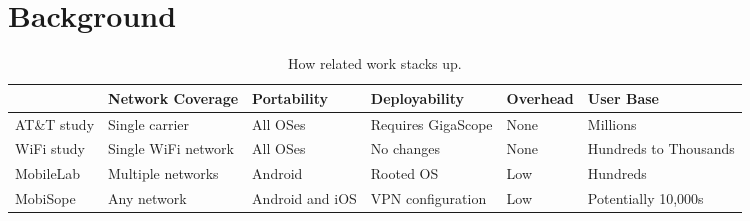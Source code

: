 \section{Background}
\label{sec:motivation}

\begin{table*}[t]
\begin{center}
\begin{tabular}{|l|l|l|l|l|l|}
\hline
 & \textbf{Network Coverage} &  \textbf{Portability} &  \textbf{Deployability} &  \textbf{Overhead} &  \textbf{User Base} \\ \hline
AT\&T study & Single carrier & All OSes & Requires GigaScope & None & Millions \\ \hline
WiFi study & Single WiFi network & All OSes & No changes & None & Hundreds to Thousands \\ \hline
MobileLab & Multiple networks & Android & Rooted OS & Low & Hundreds \\ \hline
MobiSope & Any network & Android and iOS & VPN configuration & Low & Potentially 10,000s \\ \hline
\end{tabular}
\end{center}
\label{tab:relatedCompare}
\caption{How related work stacks up.}
\end{table*}%




